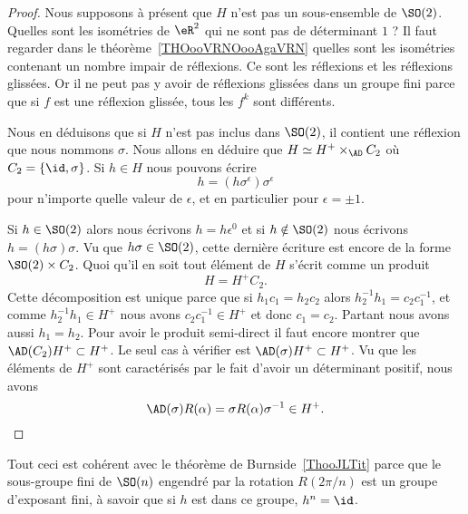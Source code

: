 \begin{proof}
        Nous supposons à présent que \( H\) n'est pas un sous-ensemble de \( \SO(2)\). Quelles sont les isométries de \( \eR^2\) qui ne sont pas de déterminant \( 1\) ? Il faut regarder dans le théorème~\ref{THOooVRNOooAgaVRN} quelles sont les isométries contenant un nombre impair de réflexions. Ce sont les réflexions et les réflexions glissées. Or il ne peut pas y avoir de réflexions glissées dans un groupe fini parce que si \( f\) est une réflexion glissée, tous les \( f^k\) sont différents.

        Nous en déduisons que si \( H\) n'est pas inclus dans \( \SO(2)\), il contient une réflexion que nous nommons \( \sigma\). Nous allons en déduire que \( H\simeq H^+\times_{\AD}C_2\) où \( C_2=\{ \id,\sigma \}\). Si \( h\in H\) nous pouvons écrire
        \begin{equation}
            h=(h\sigma^{\epsilon})\sigma^{\epsilon}
        \end{equation}
        pour n'importe quelle valeur de \( \epsilon\), et en particulier pour \( \epsilon=\pm 1\).

        Si \( h\in \SO(2)\) alors nous écrivons \( h=h\epsilon^{0}\) et si \( h\notin\SO(2)\) nous écrivons \( h=(h\sigma)\sigma\). Vu que \( h\sigma\in\SO(2)\), cette dernière écriture est encore de la forme \( \SO(2)\times C_2\). Quoi qu'il en soit tout élément de \( H\) s'écrit comme un produit
        \begin{equation}
            H=H^+C_2.
        \end{equation}
        Cette décomposition est unique parce que si \( h_1c_1=h_2c_2\) alors \( h_2^{-1}h_1=c_2c_1^{-1}\), et comme \( h_2^{-1}h_1\in H^+\) nous avons \( c_2c_1^{-1}\in H^+\) et donc \( c_1=c_2\). Partant nous avons aussi \( h_1=h_2\). Pour avoir le produit semi-direct il faut encore montrer que \( \AD(C_2)H^+\subset H^+\). Le seul cas à vérifier est \( \AD(\sigma)H^+\subset H^+\). Vu que les éléments de \( H^+\) sont caractérisés par le fait d'avoir un déterminant positif, nous avons
        \begin{equation}
            \AD(\sigma)R(\alpha)=\sigma R(\alpha)\sigma^{-1}\in H^+.
        \end{equation}
\end{proof}

\begin{remark}
    Tout ceci est cohérent avec le théorème de Burnside~\ref{ThooJLTit} parce que le sous-groupe fini de \( \SO(n)\) engendré par la rotation \( R(2\pi/n)\) est un groupe d'exposant fini, à savoir que si \( h\) est dans ce groupe, \( h^n=\id\).
\end{remark}

